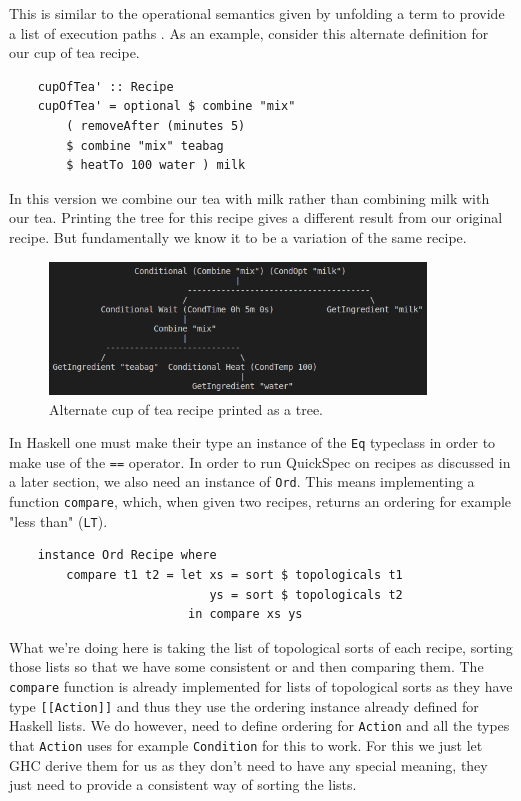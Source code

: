 \documentclass[11pt]{article}
\begin{document}
This is similar to the operational semantics given by unfolding a
term to provide a list of execution paths \cite{hutton}. As an example,
consider this alternate definition for our cup of tea recipe.

\begin{lstlisting}
    cupOfTea' :: Recipe
    cupOfTea' = optional $ combine "mix" 
        ( removeAfter (minutes 5)
        $ combine "mix" teabag
        $ heatTo 100 water ) milk
\end{lstlisting}

In this version we combine our tea with milk rather than combining milk with our tea.
Printing the tree for this recipe gives a different result from our original recipe.
But fundamentally we know it to be a variation of the same recipe.

\begin{figure}[h]
\includegraphics[width=10cm, keepaspectratio]{cupOfTea2.png}
\centering
\caption{Alternate cup of tea recipe printed as a tree.}
\end{figure}

In Haskell one must make their type an instance of the \texttt{Eq} typeclass in
order to make use of the \texttt{==} operator. In order to run QuickSpec on recipes
as discussed in a later section, we also need an instance of \texttt{Ord}.
This means implementing a function \texttt{compare}, which, when given two recipes,
returns an ordering for example "less than" (\texttt{LT}).

\begin{lstlisting}
    instance Ord Recipe where
        compare t1 t2 = let xs = sort $ topologicals t1
                            ys = sort $ topologicals t2
                         in compare xs ys
\end{lstlisting}

What we're doing here is taking the list of topological sorts of each recipe, sorting those
lists so that we have some consistent or and then comparing them. The \texttt{compare} function
is already implemented for lists of topological sorts as they have type \texttt{[[Action]]}
and thus they use the ordering instance already defined for Haskell lists. We do however,
need to define ordering for \texttt{Action} and all the types that \texttt{Action} uses
for example \texttt{Condition} for this to work. For this we just let GHC derive them for
us as they don't need to have any special meaning, they just need to provide a consistent
way of sorting the lists.
\end{document}
